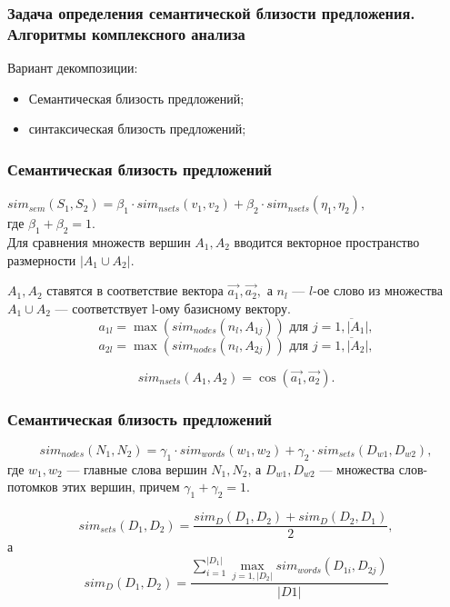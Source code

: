 \documentclass{beamer}
\begin{document}
\begin{frame}
\frametitle{Задача определения семантической близости предложения. Алгоритмы комплексного анализа}

Вариант декомпозиции:
\begin{itemize}
\item{
Семантическая близость предложений;
}
\item{
синтаксическая близость предложений;
}
\end{itemize}

\end{frame}

\begin{frame}
\frametitle{Семантическая близость предложений}

$sim_{sem}(S_1 , S_2) = \beta_1 \cdot sim_{nsets}(v_1, v_2) + \beta_2 \cdot sim_{nsets}(\eta_1, \eta_2), $\\
где
$\beta_1 + \beta_2 = 1$.\\
\vspace{0.5cm}
Для сравнения множеств вершин $A_1,A_2$ вводится векторное пространство размерности $|A_1 \cup A_2|$.

$A_1,A_2$ ставятся в соответствие вектора $\vec{a_1},\vec{a_2}, $ 
а $n_l$ --- $l$-ое слово из множества $A_1 \cup A_2$ --- соответствует l-ому базисному вектору.
$$a_{1l} = \max(sim_{nodes}(n_l, A_{1j})) \text{ для } j=\overline{1,|A_1|},$$
$$a_{2l} = \max(sim_{nodes}(n_l, A_{2j})) \text{ для } j=\overline{1,|A_2|},$$

$$ sim_{nsets}(A_1,A_2) = \cos\left(\vec{a_1},\vec{a_2}\right). $$

\end{frame}

\begin{frame}
\frametitle{Семантическая близость предложений}

$$ sim_{nodes}(N_1, N_2) = \gamma_1 \cdot sim_{words}(w_1,w_2) + \gamma_2 \cdot sim_{sets}(D_{w1}, D_{w2}), $$
где $w_1, w_2$ --- главные слова вершин $N_1, N_2$, а $D_{w1}, D_{w2}$ --- множества слов-потомков этих вершин,
причем $\gamma_1+\gamma_2=1$.

$$sim_{sets}(D_1, D_2) = \frac{sim_{D}(D_1,D_2) + sim_{D}(D_2, D_1)}{2}, $$
а 
$$sim_{D}(D_1, D_2) = \frac{ \sum \limits_{i=1}^{|D_1|} \max_{j=1,|D_2|} sim_{words}(D_{1i}, D_{2j}) } { |D1| }$$

\end{frame}
\end{document}
